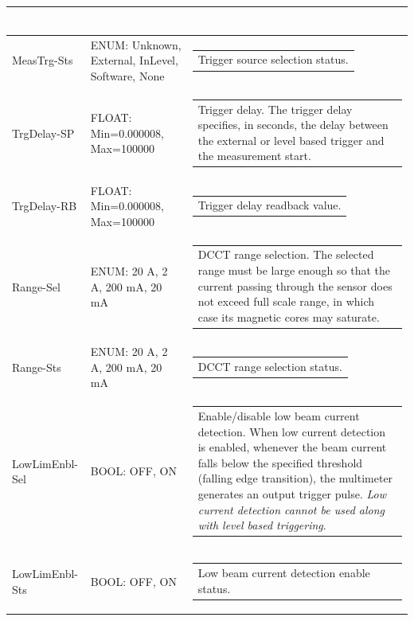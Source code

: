\documentclass[openany]{article}
\begin{document}
\begin{longtable}{| m{3.0cm} m{4.5cm} m{7.0cm} |}
\begin{tabular}{@{}m{6cm}@{}}
					  \end{tabular} \\ \hline
		MeasTrg-Sts & ENUM: Unknown, External, InLevel, Software, None & \begin{tabular}{@{}m{6cm}@{}}
	    					Trigger source selection status.
						\end{tabular} \\ \hline
		TrgDelay-SP & FLOAT: Min=0.000008, Max=100000 & \begin{tabular}{@{}m{6cm}@{}}
	    					Trigger delay. The trigger delay specifies, in seconds, the delay between the external or level based trigger and the measurement start.
						\end{tabular} \\ \hline
		TrgDelay-RB & FLOAT: Min=0.000008, Max=100000 & \begin{tabular}{@{}m{6cm}@{}}
	    					Trigger delay readback value.
						\end{tabular} \\ \hline
		Range-Sel & ENUM: 20 A, 2 A, 200 mA, 20 mA & \begin{tabular}{@{}m{6cm}@{}}
	    					DCCT range selection. The selected range must be large enough so that the current passing through the sensor does not exceed full scale range, in which case its magnetic cores may saturate.
						\end{tabular} \\ \hline
		Range-Sts & ENUM: 20 A, 2 A, 200 mA, 20 mA & \begin{tabular}{@{}m{6cm}@{}}
	    					DCCT range selection status.
						\end{tabular} \\ \hline
		LowLimEnbl-Sel & BOOL: OFF, ON & \begin{tabular}{@{}m{6cm}@{}}
	    					Enable/disable low beam current detection. When low current detection is enabled, whenever the beam current falls below the specified threshold (falling edge transition), the multimeter generates an output trigger pulse. \emph{Low current detection cannot be used along with level based triggering}.
						\end{tabular} \\ \hline
		LowLimEnbl-Sts & BOOL: OFF, ON & \begin{tabular}{@{}m{6cm}@{}}
	    					Low beam current detection enable status.
						\end{tabular} \\ \hline

\end{longtable}
\end{document}
